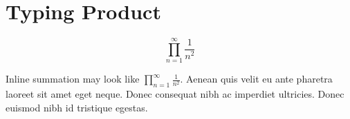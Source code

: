 \documentclass{article}
\begin{document}
	
\section{Typing Product}

\begin{equation}
\prod_{n=1}^{\infty} \frac{1}{n^2}
\end{equation}

Inline summation may look like $\prod_{n=1}^{\infty} \frac{1}{n^2}$. Aenean quis velit eu ante pharetra laoreet sit amet eget neque. Donec consequat nibh ac imperdiet ultricies. Donec euismod nibh id tristique egestas.
\end{document}
